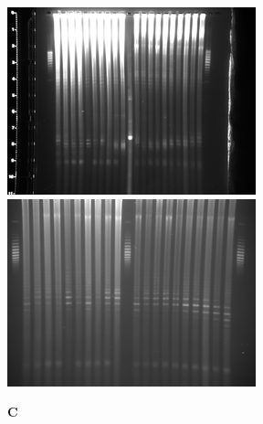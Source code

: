 \documentclass[10pt,a4]{article}
\begin{document}
\begin{figure}[ht!]
  \begin{minipage}{.49\textwidth}
    \includegraphics[width=\textwidth]{figures/diurnal/Y_CQ01_high_exposure.png}
  \end{minipage}
  \begin{minipage}{.49\textwidth}
    \includegraphics[width=\textwidth]{figures/diurnal/20130618_1511.png}
  \end{minipage}
  
  \vspace{-.5cm}
  \textbf{C}
  \vspace{.25cm}
  

\end{figure}
\end{document}
